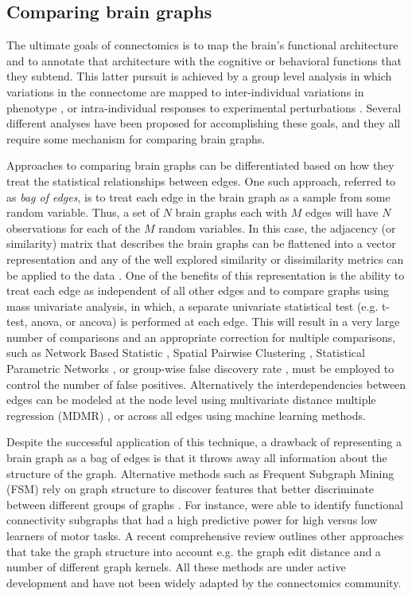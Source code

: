 \subsection{Comparing brain graphs} 

The ultimate goals of connectomics is to map the brain's functional architecture and to annotate that architecture with the cognitive or behavioral functions that they subtend. This latter pursuit is achieved by a group level analysis in which variations in the connectome are mapped to inter-individual variations in phenotype \cite{Kelly2011}, or intra-individual responses to experimental perturbations \cite{Shirer}. Several different analyses have been proposed for accomplishing these goals, and they all require some mechanism for comparing brain graphs. 
 
Approaches to comparing brain graphs can be differentiated based on how they treat the statistical relationships between edges. One such approach, referred to as \emph{bag of edges}, is to treat each edge in the brain graph as a sample from some random variable. Thus, a set of $N$ brain graphs each with $M$ edges will have $N$ observations for each of the $M$ random variables. In this case, the adjacency (or similarity) matrix that describes the brain graphs can be flattened into a vector representation and any of the well explored similarity or dissimilarity metrics can be applied to the data \cite{Ravindran}. One of the benefits of this representation is the ability to treat each edge as independent of all other edges and to compare graphs using mass univariate analysis, in which, a separate univariate statistical test (e.g. t-test, anova, or ancova) is performed at each edge. This will result in a very large number of comparisons and an appropriate correction for multiple comparisons, such as Network Based Statistic \cite{Zalesky2011}, Spatial Pairwise Clustering \cite{Zalesky2012}, Statistical Parametric Networks \cite{Ginestet2013}, or group-wise false discovery rate \cite{}, must be employed to control the number of false positives. Alternatively the interdependencies between edges can be modeled at the node level using multivariate distance multiple regression (MDMR) \cite{Shehzad2014}, or across all edges using machine learning methods\cite{Craddock2009, Dosenbach2010, Richiardi2011}.

Despite the successful application of this technique, a drawback of representing a brain graph as a bag of edges is that it throws away all information about the structure of the graph. Alternative methods such as Frequent Subgraph Mining (FSM) rely on graph structure to discover features that better discriminate between different groups of graphs \cite{Harrison2013}. For instance, \cite{Bogdanov2014} were able to identify functional connectivity subgraphs that had a high predictive power for high versus low learners of motor tasks. A recent comprehensive review \cite{Richiardi2013} outlines other approaches that take the graph structure into account e.g. the graph edit distance and a number of different graph kernels. All these methods are under active development and have not been widely adapted by the connectomics community.

